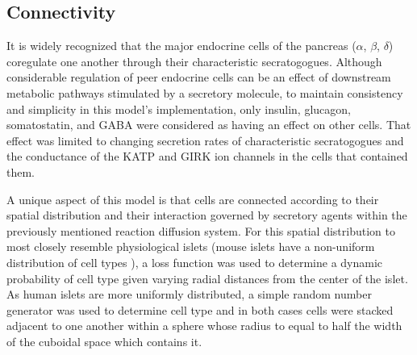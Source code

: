 \subsection{Connectivity}
It is widely recognized that the major endocrine cells of the pancreas ($\alpha$, $\beta$, $\delta$) coregulate one another through their characteristic secratogogues. Although considerable regulation of peer endocrine cells can be an effect of downstream metabolic pathways stimulated by a secretory molecule, to maintain consistency and simplicity in this model's implementation, only insulin, glucagon, somatostatin, and GABA were considered as having an effect on other cells. That effect was limited to changing secretion rates of characteristic secratogogues and the conductance of the KATP and  GIRK ion channels in the cells that contained them.
\par A unique aspect of this model is that cells are connected according to their spatial distribution and their interaction governed by secretory agents within the previously mentioned reaction diffusion system. For this spatial distribution to most closely resemble physiological islets (mouse islets have a non-uniform distribution of cell types \cite{steiner_pancreatic_2010}), a loss function was used to determine a dynamic probability of cell type given varying radial distances from the center of the islet. As human islets are more uniformly distributed, a simple random number generator was used to determine cell type and in both cases cells were stacked adjacent to one another within a sphere whose radius to equal to half the width of the cuboidal space which contains it.
